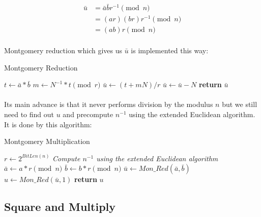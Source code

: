 \documentclass[thesis=B,english]{FITthesis}[2012/10/20]
\begin{document}
\begin{equation}
\begin{split}
\bar{u} & = \bar{a}\bar{b}r^{-1} \pmod{n} \\
 & = (ar)(br)r^{-1} \pmod{n} \\
 & = (ab)r \pmod{n}
\end{split}
\end{equation}
\medskip

\paragraph*{}{
Montgomery reduction which gives us \(\bar{u}\) is implemented this way:
}

\begin{algorithm}[H]
\caption{Montgomery Reduction}
\begin{algorithmic}[1]
 \State $t \gets\bar{a} *\bar{b}$
 \State $m \gets N^{-1} * t \pmod{r}$
 \State $\bar{u} \gets (t + mN) / r$
  \State $\bar{u} \gets\bar{u} - N$
 \EndIf
\State \textbf{return} $\bar{u}$
\EndFunction
\end{algorithmic}
\end{algorithm}

\paragraph*{}
{
Its main advance is that it never performs division by the modulus \(n\) but we still need to find out \(u\) and precompute \(n^{-1}\) using the extended Euclidean algorithm.
It is done by this algorithm: }

\begin{algorithm}[H]
\caption{Montgomery Multiplication}
\begin{algorithmic}[1]
 \State $r \gets 2^{BitLen(n)}$
 \State \textit{Compute \(n^{-1}\) using the extended Euclidean algorithm}
 \State $\bar{a} \gets a *r \pmod{n}$
 \State $\bar{b} \gets b * r \pmod{n}$
 \State $\bar{u} \gets Mon\_Red(\bar{a}, \bar{b})$
 \State $u \gets Mon\_Red(\bar{u}, 1)$
 \State \textbf{return} $u$
\EndFunction
\end{algorithmic}
\end{algorithm}


\subsection{Square and Multiply}
\end{document}
